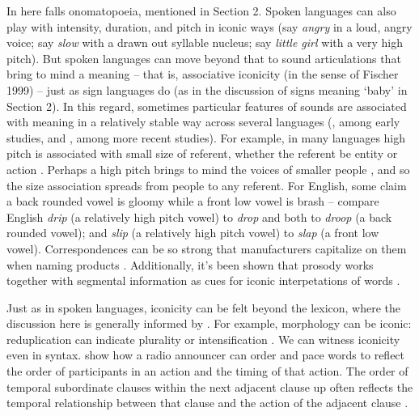 \documentclass[output=paper,
modfonts
]{LSP/langsci}
\begin{document}
In here falls onomatopoeia, mentioned in Section 2. Spoken languages can
also play with intensity, duration, and pitch in iconic ways (say
\emph{angry} in a loud, angry voice; say \emph{slow} with a drawn out
syllable nucleus; say \emph{little girl} with a very high pitch). But
spoken languages can move beyond that to sound articulations that bring
to mind a meaning -- that is, associative iconicity (in the sense of
Fischer 1999) -- just as sign languages do (as in the discussion of
signs meaning `baby' in Section 2). In this regard, sometimes particular
features of sounds are associated with meaning in a relatively stable
way across several languages (\citealt{sapir1929n,taylor1963,werner1952,wertheimer1958}, among early studies, and \citealt{hinton1994,voeltz2001}, among more recent studies). For
example, in many languages high pitch is associated with small size of
referent, whether the referent be entity or action \citep{jespersen1922n,nuckolls1999}. Perhaps a high pitch brings to mind the voices of
smaller people \citep{evans2006}, and so the size
association spreads from people to any referent. For English, some claim
a back rounded vowel is gloomy while a front low vowel is brash --
compare English \emph{drip} (a relatively high pitch vowel) to
\emph{drop} and both to \emph{droop} (a back rounded vowel); and
\emph{slip} (a relatively high pitch vowel) to \emph{slap} (a front low
vowel). Correspondences can be so strong that manufacturers capitalize
on them when naming products \citep{spence2012}. Additionally, it's been
shown that prosody works together with segmental information as cues for
iconic interpetations of words \citep{dingemanse2016}.

Just as in spoken languages, iconicity can be felt beyond the lexicon,
where the discussion here is generally informed by \citet{fabisiak2011}. For example, morphology can be iconic: reduplication
\citep{moravcsik1978n} can indicate plurality \citep{macdonald1976} or
intensification \citep{murane1974}. We can witness iconicity even in syntax.
\citet{moulton1981} show how a radio announcer can order and
pace words to reflect the order of participants in an action and the
timing of that action. The order of temporal subordinate clauses within
the next adjacent clause up often reflects the temporal relationship
between that clause and the action of the adjacent clause \citep{haiman1985n,kortmann1991,diessel2005}.
\end{document}
